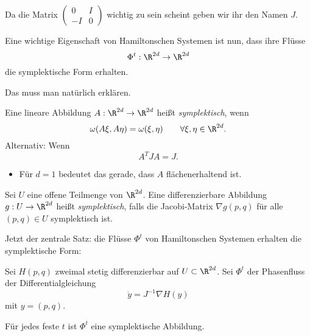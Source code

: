 Da die Matrix $\begin{pmatrix} 0 & I \\ -I & 0 \end{pmatrix}$ wichtig zu sein scheint geben wir ihr den Namen $J$.

Eine wichtige Eigenschaft von Hamiltonschen Systemen ist nun, dass ihre Flüsse
\begin{equation*}
  \Phi^t: \R^{2d} \to \R^{2d}
\end{equation*}
die symplektische Form erhalten.

Das muss man natürlich erklären.

\begin{definition}
  Eine lineare Abbildung $A: \R^{2d} \to \R^{2d}$ heißt \emph{symplektisch}, wenn
  \begin{equation*}
    \omega(A\xi, A\eta) = \omega(\xi, \eta) \qquad \forall \xi, \eta \in \R^{2d}.
  \end{equation*}
  Alternativ: Wenn
  \begin{equation*}
    A^T J A = J.
  \end{equation*}
\end{definition}

\begin{itemize}
\item Für $d=1$ bedeutet das gerade, dass $A$ flächenerhaltend ist.
\end{itemize}

\begin{definition}
  Sei $U$ eine offene Teilmenge von $\R^{2d}$.
  Eine differenzierbare Abbildung $g: U \to \R^{2d}$ heißt \emph{symplektisch}, falls die Jacobi-Matrix $\nabla g(p,q)$ für alle $(p, q) \in U$ symplektisch ist.
\end{definition}

Jetzt der zentrale Satz:
die Flüsse $\Phi^t$ von Hamiltonschen Systemen erhalten die symplektische Form:

\begin{satz}[Poincaré, 1899]
  Sei $H(p, q)$ zweimal stetig differenzierbar auf $U \subset \R^{2d}$.
  Sei $\Phi^t$ der Phasenfluss der Differentialgleichung
  \begin{equation*}
    \dot y = J^{-1} \nabla H(y)
  \end{equation*}
  mit $y = (p, q)$.

  Für jedes feste $t$ ist $\Phi^t$ eine symplektische Abbildung.
\end{satz}

